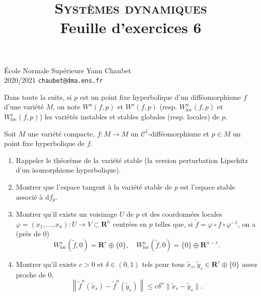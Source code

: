 \documentclass[a4paper,10pt,openany]{article}
\title{\textsc{Syst\`emes dynamiques} \\ Feuille d'exercices 6}
\date{}
\author{}
\theoremstyle{plain}
\theoremstyle{definition}
\newcommand{\dd}{\mathrm{d}}
\newcommand{\R}{\mathbf{R}}
\begin{document}
{\noindent \'Ecole Normale Sup\'erieure  \hfill Yann Chaubet } \\
{2020/2021 \hfill \texttt{chaubet@dma.ens.fr}}
{\let\newpage\relax\maketitle}
\maketitle
\noindent Dans toute la suite, si $p$ est un point fixe hyperbolique d'un diff\'eomorphisme $f$ d'une vari\'et\'e $M$, on note $W^u(f,p)$ et $W^s(f,p)$ (resp. $W^u_\mathrm{loc}(f,p)$ et $W^s_\mathrm{loc}(f,p)$) les vari\'et\'es instables et stables globales (resp. locales) de $p$.

\vspace{0.6cm}

 \vspace{1.5mm} 

\noindent Soit $M$ une vari\'et\'e compacte, $f : M \to M$ un $\mathcal{C}^1$-diff\'eomorphisme et $p \in M$ un point fixe hyperbolique de $f$. 
\begin{enumerate}
\item Rappeler le th\'eor\`eme de la vari\'et\'e stable (la version perturbation Lipschitz d'un isomorphisme hyperbolique).
\item Montrer que l'espace tangent \`a la vari\'et\'e stable de $p$ est l'espace stable associ\'e \`a $\dd f_p$.
\item Montrer qu'il existe un voisinage $U$ de $p$ et des coordonn\'ees locales $\varphi = (x_1, \dots, x_n) : U \to V \subset \R^n$ centr\'ees en $p$ telles que, si $\tilde{f} = \varphi \circ f \circ \varphi^{-1}$, on a (pr\`es de $0$)
$$
W^s_\mathrm{loc}(\tilde{f}, 0) = \R^r \oplus \{0\}, \quad W^u_\mathrm{loc}(\tilde{f}, 0) = \{0\}\oplus \R^{n-r}.
$$
\item Montrer qu'il existe $c>0$ et $\delta \in (0,1)$ tels pour tous $\tilde{x}_s, \tilde{y}_s \in \R^r \oplus \{0\}$ assez proche de $0$, 
$$
\left\|\tilde{f}^n(\tilde{x}_s) - \tilde{f}^n(\tilde{y}_s)\right\| \leq c \delta^n \|\tilde{x}_s - \tilde{y}_s\|.
$$
\end{enumerate}

\vspace{0.6cm}

 \vspace{1.5mm} 
\end{document}
